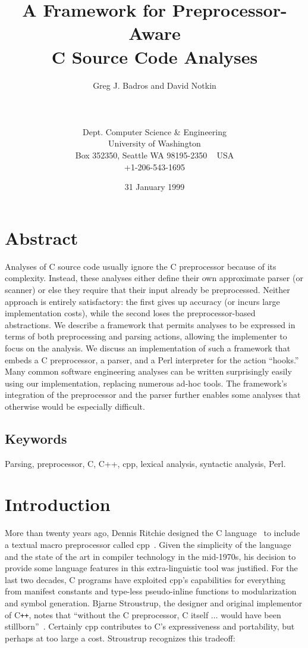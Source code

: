 \documentclass{article}
\title{A Framework for Preprocessor-Aware \\ C Source Code Analyses}
\author{
        \hspace*{-2ex}
        \parbox{4in} {\begin{center}
        Greg J. Badros and David Notkin\\
        \end{center}}\\
        \parbox{4in} {\begin{center}
            \begin{small}
              Dept. Computer Science \& Engineering\\
              University of Washington \\
              Box 352350, Seattle WA  98195-2350 ~ USA \\
              +1-206-543-1695\\
              \email{\{gjb,notkin\}@cs.washington.edu}
            \end{small}
        \end{center} }
}
\date{31 January 1999}
\newcommand{\Cpp}{\mbox{\textsf{cpp}}}
\newcommand{\CPP}{\mbox{C\texttt{++}}}
\newcommand{\C}{\mbox{C}}
\begin{document}
\maketitle

\thispagestyle{empty}  %

\pagestyle{plain}

\section*{Abstract}
\label{sec:abstract}
Analyses of \C{} source code usually ignore the \C{} preprocessor
because of its complexity.  Instead, these analyses either define their
own approximate parser (or scanner) or else they require that their
input already be preprocessed.  Neither approach is entirely
satisfactory: the first gives up accuracy (or incurs large
implementation costs), while the second loses the preprocessor-based
abstractions.  We describe a framework that permits analyses to be
expressed in terms of both preprocessing and parsing actions, allowing
the implementer to focus on the analysis.  We discuss an implementation of
such a framework that embeds a \C{} preprocessor, a parser, and a Perl
interpreter for the action ``hooks.''  Many common software engineering
analyses can be written surprisingly easily using our implementation,
replacing numerous ad-hoc tools.  The framework's integration of the
preprocessor and the parser further enables some analyses that otherwise
would be especially difficult.

\subsection*{Keywords}
Parsing, preprocessor, C, C++, cpp, lexical analysis, syntactic analysis, Perl.

\bigskip

\section{Introduction}
\label{sec:intro}
More than twenty years ago, Dennis Ritchie designed the \C{}
language~\cite{Kernighan88} to include a textual macro preprocessor
called \Cpp{}~\cite[Ch.~3]{Harbison91}.  Given the simplicity of the
language and the state of the art in compiler technology in the
mid-1970s, his decision to provide some language features in this
extra-linguistic tool was justified.  For the last two
decades, \C{} programs have exploited \Cpp{}'s capabilities for
everything from manifest constants and type-less pseudo-inline
functions to modularization and symbol generation.  Bjarne
Stroustrup, the designer and original implementor of \CPP{}, notes that
``without the \C{} preprocessor, \C{} itself $\ldots$ would have been
stillborn''~\cite[p.~119]{Stroustrup94}.  Certainly \Cpp{} contributes
to \C{}'s expressiveness and portability, but perhaps at too large a
cost.  Stroustrup recognizes this tradeoff:
\end{document}
